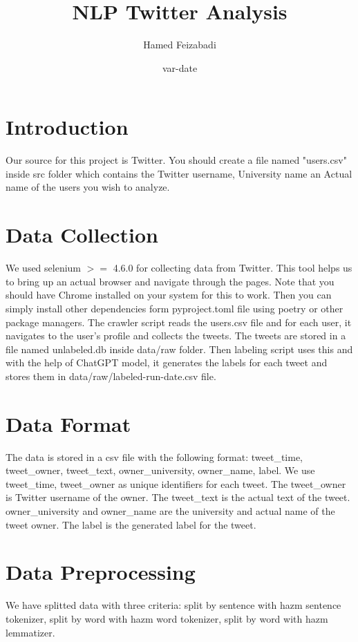 \documentclass[12pt, letterpaper]{article}
\title{NLP Twitter Analysis}
\author{Hamed Feizabadi}
\date{var-date}
\begin{document}
\maketitle

\section{Introduction}
Our source for this project is Twitter. You should create a file named "users.csv" inside src folder which contains the Twitter username, University name an Actual name of the users you wish to analyze.

\section{Data Collection}
We used selenium $>=$ 4.6.0 for collecting data from Twitter. This tool helps us to bring up an actual browser and navigate through the pages. Note that you should have Chrome installed on your system for this to work. Then you can simply install other dependencies form pyproject.toml file using poetry or other package managers.
The crawler script reads the users.csv file and for each user, it navigates to the user's profile and collects the tweets. The tweets are stored in a file named unlabeled.db inside data\slash raw folder. Then labeling script uses this and with the help of ChatGPT model, it generates the labels for each tweet and stores them in data\slash raw\slash labeled-run-date.csv file.

\section{Data Format}
The data is stored in a csv file with the following format: tweet\_time, tweet\_owner, tweet\_text, owner\_university, owner\_name, label.
We use tweet\_time, tweet\_owner as unique identifiers for each tweet. The tweet\_owner is Twitter username of the owner. The tweet\_text is the actual text of the tweet. owner\_university and owner\_name are the university and actual name of the tweet owner. The label is the generated label for the tweet.

\section{Data Preprocessing}
We have splitted data with three criteria: split by sentence with hazm sentence tokenizer, split by word with hazm word tokenizer, split by word with hazm lemmatizer.
\end{document}
